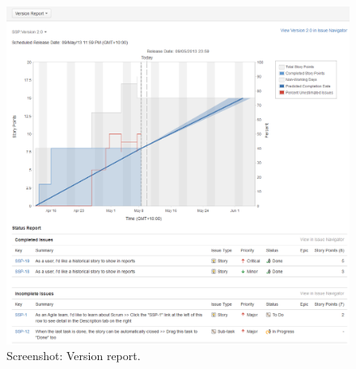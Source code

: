 \begin{figure}[h]
	\centering
	\includegraphics[scale=0.4]{img/version-report.png}
	\caption{Screenshot: Version report.} 
	\label{fig:version-report}
\end{figure}

